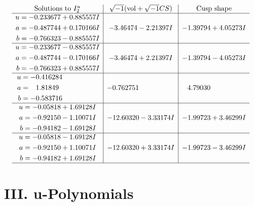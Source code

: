 \documentclass[1p]{elsarticle_modified}
\theoremstyle{definition}
\newcommand{\I}{\sqrt{-1}}
\begin{document}
$$\begin{array}{c|c|c}  
\text{Solutions to }I^u_{2}& \I (\text{vol} + \sqrt{-1}CS) & \text{Cusp shape}\\
 \hline 
\begin{aligned}
u &= -0.233677 + 0.885557 I \\
a &= -0.487744 + 0.170166 I \\
b &= -0.766323 - 0.885557 I\end{aligned}
 & -3.46474 - 2.21397 I & -1.39794 + 4.05273 I \\ \hline\begin{aligned}
u &= -0.233677 - 0.885557 I \\
a &= -0.487744 - 0.170166 I \\
b &= -0.766323 + 0.885557 I\end{aligned}
 & -3.46474 + 2.21397 I & -1.39794 - 4.05273 I \\ \hline\begin{aligned}
u &= -0.416284\phantom{ +0.000000I} \\
a &= \phantom{-}1.81849\phantom{ +0.000000I} \\
b &= -0.583716\phantom{ +0.000000I}\end{aligned}
 & -0.762751\phantom{ +0.000000I} & \phantom{-}4.79030\phantom{ +0.000000I} \\ \hline\begin{aligned}
u &= -0.05818 + 1.69128 I \\
a &= -0.92150 - 1.10071 I \\
b &= -0.94182 - 1.69128 I\end{aligned}
 & -12.60320 - 3.33174 I & -1.99723 + 3.46299 I \\ \hline\begin{aligned}
u &= -0.05818 - 1.69128 I \\
a &= -0.92150 + 1.10071 I \\
b &= -0.94182 + 1.69128 I\end{aligned}
 & -12.60320 + 3.33174 I & -1.99723 - 3.46299 I\\
 \hline 
 \end{array}$$\newpage
\newpage\renewcommand{\arraystretch}{1}
\centering \section*{ III. u-Polynomials}
\end{document}
